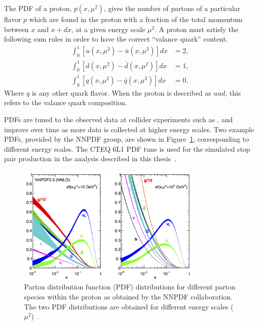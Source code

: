 The PDF of a proton, $p(x, \mu^2)$, gives the number of partons of a particular
flavor $p$ which are found in the proton with a fraction of the total momentum
between $x$ and $x+dx$, at a given energy scale $\mu^2$.
A proton must satisfy the following sum rules in order to have the correct
``valance quark'' content.
\begin{align}
  \int_0^1 \left[ u(x, \mu^2) - \bar{u}(x, \mu^2) \right] dx & = 2, \\
  \int_0^1 \left[ d(x, \mu^2) - \bar{d}(x, \mu^2) \right] dx & = 1, \\
  \int_0^1 \left[ q(x, \mu^2) - \bar{q}(x, \mu^2) \right] dx & = 0,
\end{align}
Where $q$ is any other quark flavor.
When the proton is described as $uud$, this refers to the valance quark
composition.

PDFs are tuned to the observed data at collider experiments such as \atlas,
and improve over time as more data is collected at higher energy scales.
Two example PDFs, provided by the NNPDF group, are shown in
Figure~\ref{fig:pdfs}, corresponding to different energy scales.
The CTEQ 6L1 PDF tune is used for the simulated stop pair production in the
analysis described in this thesis~\cite{Nadolsky:2008zw}.

\begin{figure}
  \centering
  \includegraphics[width=0.80\textwidth]{figs/mc_gen/pdfs.png}
  \caption{Parton distribution function (PDF) distributions for different
    parton species within the proton as obtained by the NNPDF collaboration.
    The two PDF distributions are obtained for different energy
    scales ($\mu^2$)~\cite{nnpdf}.
  }
  \label{fig:pdfs}
\end{figure}



